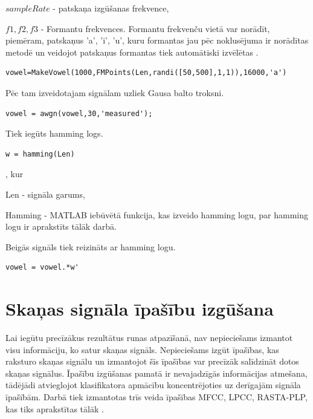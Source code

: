 \documentclass[12pt,paper=A4]{report}
\begin{document}
$sampleRate$ - patskaņa izgūšanas frekvence,

$f1,f2,f3$ - Formantu frekvences. Formantu frekvenču vietā var norādīt, piemēram, patskaņus 'a', 'i', 'u', kuru formantas jau pēc noklusējuma ir norādītas metodē un veidojot patskaņus formantas tiek automātiski izvēlētas \cite{dtw17}.
\begin{lstlisting}
vowel=MakeVowel(1000,FMPoints(Len,randi([50,500],1,1)),16000,'a')
\end{lstlisting}

Pēc tam izveidotajam signālam uzliek Gausa balto troksni.

\begin{lstlisting} 
vowel = awgn(vowel,30,'measured'); 
\end{lstlisting}

Tiek iegūts hamming logs.

\begin{lstlisting}
w = hamming(Len)
\end{lstlisting}

, kur 

Len - signāla garums,

Hamming - MATLAB iebūvētā funkcija, kas izveido hamming logu, par hamming logu ir aprakstīts tālāk darbā.

Beigās signāls tiek reizināts ar hamming logu. 

\begin{lstlisting}
vowel = vowel.*w'
\end{lstlisting}


\chapter{Skaņas signāla īpašību izgūšana}

Lai iegūtu precīzākus rezultātus runas atpazīšanā, nav nepieciešams izmantot visu informāciju, ko satur skaņas signāls. Nepieciešams izgūt īpašības, kas raksturo skaņas signālu un izmantojot šīs īpašības var precīzāk salīdzināt dotos skaņas signālus. Īpašību izgūšanas pamatā ir nevajadzīgās informācijas atmešana, tādējādi atvieglojot klasifikatora apmācību koncentrējoties uz derīgajām signāla īpašībām. Darbā tiek izmantotas trīs veida īpašības MFCC, LPCC, RASTA-PLP, kas tiks aprakstītas tālāk \cite{knn}.
\end{document}
